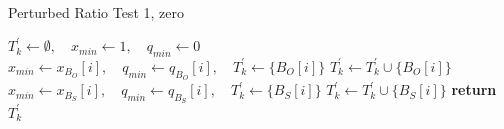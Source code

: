 \documentclass[a4paper]{article}
\begin{document}
\begin{algorithm}
\caption{Perturbed Ratio Test 1, zero}
\label{alg:ratio_test_step_1_0}
\begin{algorithmic}
\State $T_{k}^{\prime} \gets \emptyset,
  \quad x_{min} \gets 1, \quad  q_{min} \gets 0$
            \State $x_{min} \gets x_{B_{O}}[i],
	      \quad q_{min} \gets q_{B_{O}}[i],
	      \quad T_{k}^{\prime} \gets \{B_{O}[i]\}$
            \State $T_{k}^{\prime} \gets T_{k}^{\prime} \cup \{B_{O}[i]\}$	 
        \EndIf
    \EndIf
\EndFor
{}
            \State $x_{min} \gets x_{B_{S}}[i],
	      \quad q_{min} \gets q_{B_{S}}[i],
	      \quad T_{k}^{\prime} \gets \{B_{S}[i]\}$
            \State $T_{k}^{\prime} \gets T_{k}^{\prime} \cup \{B_{S}[i]\}$
	\EndIf	
    \EndIf 
\EndFor
\State \textbf{return} $T_{k}^{\prime}$
\EndFunction
\end{algorithmic}
\end{algorithm}
\end{document}
